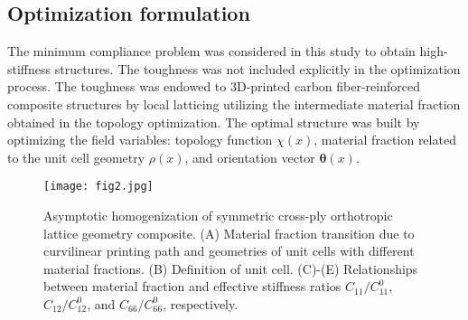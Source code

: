 \documentclass[a4paper,7pt,fleqn]{article}   %
\begin{document}
\begin{multicols}{2}
		
		\section{Optimization formulation}
		\label{Optimization formulation}
		The minimum compliance problem was considered in this study to
		obtain high-stiffness structures. The toughness was not included
		explicitly in the optimization process. The toughness was endowed to
		3D-printed carbon fiber-reinforced composite structures by local latticing
		utilizing the intermediate material fraction obtained in the topology
		optimization. The optimal structure was built by optimizing the field
		variables: topology function $\chi (x)$, material fraction related to the unit
		cell geometry $\rho (x) $, and orientation vector $\bm{\theta} (x) $.
		\begin{figure*}[t!]
			\centering
			\texttt{[image: fig2.jpg]}
			\caption{\small Asymptotic homogenization of symmetric cross-ply orthotropic lattice geometry composite. (A) Material fraction transition due to curvilinear printing path and geometries of unit cells with different material fractions. (B) Definition of unit cell. (C)-(E) Relationships between material fraction and effective stiffness ratios	$C_{11}/C_{11}^{0}$, $C_{12}/C_{12}^{0}$, and $C_{66}/C_{66}^{0}$, respectively.}
			\label{fig2}
		\end{figure*}
		

\end{multicols}
\end{document}

